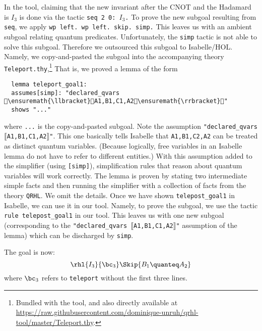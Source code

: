 \documentclass{article}
\newcommand\giturl[1]{\url{https://raw.githubusercontent.com/dominique-unruh/qrhl-tool/master/#1}}
\begin{document}
In the tool, claiming that the new invariant after the CNOT and the
Hadamard is $I_3$
is done via the tactic \texttt{seq 2 0: $I_3$.}
To prove the new subgoal resulting from \texttt{seq}, we apply
\texttt{\frenchspacing wp left. wp left. skip. simp.} This leaves us
with an ambient subgoal relating quantum predicates. Unfortunately,
the \texttt{simp} tactic is not able to solve this subgoal. Therefore
we outsourced this subgoal to Isabelle/HOL. Namely, we copy-and-pasted
the subgoal into the accompanying theory
\texttt{Teleport.thy},\footnote{Bundled with the tool, and also
  directly available at \giturl{Teleport.thy}.}
That is, we proved a lemma of the form
\begin{lstlisting}
  lemma teleport_goal1:
  assumes[simp]: "declared_qvars \ensuremath{\llbracket}A1,B1,C1,A2\ensuremath{\rrbracket}"
  shows "..."
\end{lstlisting}
where \texttt{...} is the copy-and-pasted subgoal. Note the assumption
\texttt{"declared\_qvars $\llbracket$A1,B1,C1,A2$\rrbracket$"}.
This one basically tells Isabelle that \texttt{A1,B1,C2,A2} can be
treated as distinct quantum variables. (Because logically, free
variables in an Isabelle lemma do not have to refer to different
entities.) With this assumption added to the simplifier
(using \texttt{[simp]}), simplification rules that reason about quantum
variables will work correctly. The lemma is proven by stating two
intermediate simple facts and then running the simplifier with a
collection of facts from the theory \texttt{QRHL}. We omit the details.  Once
we have shown \texttt{telepost\_goal1} in Isabelle, we can use it in
our tool. Namely, to prove the subgoal, we use the tactic \texttt{rule
  telepost\_goal1} in our tool. This leaves us with one new subgoal (corresponding to
the \texttt{"declared\_qvars $\llbracket$A1,B1,C1,A2$\rrbracket$"}
assumption of the lemma) which can be discharged by \texttt{simp}.

The goal is now:
\[
  \rhl{I_3}{\bc_3}\Skip{B_1\quanteq A_2}
\]
where $\bc_3$
refers to \texttt{teleport} without the first three lines.
\end{document}
